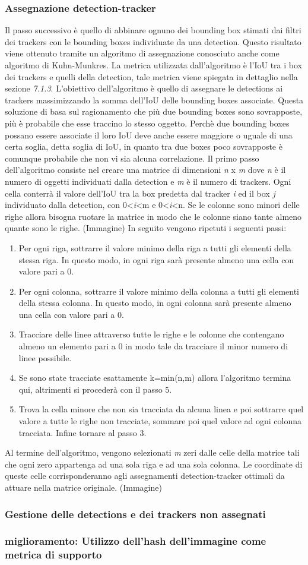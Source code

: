 \subsubsection{Assegnazione detection-tracker}
Il passo successivo è quello di abbinare ognuno dei bounding box stimati dai filtri dei trackers con le bounding boxes individuate da una detection.
Questo risultato viene ottenuto tramite un algoritmo di assegnazione conosciuto anche come algoritmo di Kuhn-Munkres. La metrica utilizzata dall'algoritmo è l'IoU tra i box dei trackers e quelli della detection, tale metrica viene spiegata in dettaglio nella sezione \textit{7.1.3}. L'obiettivo dell'algoritmo è quello di assegnare le detections ai trackers massimizzando la somma dell'IoU delle bounding boxes associate. Questa soluzione di basa sul ragionamento che più due bounding boxes sono sovrapposte, più è probabile che esse traccino lo stesso oggetto. Perchè due bounding boxes possano essere associate il loro IoU deve anche essere maggiore o uguale di una certa soglia, detta soglia di IoU, in quanto tra due boxes poco sovrapposte è comunque probabile che non vi sia alcuna correlazione.
Il primo passo dell'algoritmo consiste nel creare una matrice di dimensioni \textit{n} x \textit{m} dove \textit{n} è il numero di oggetti individuati dalla detection e \textit{m} è il numero di trackers. Ogni cella conterrà il valore dell'IoU tra la box predetta dal tracker \textit{i} ed il box \textit{j} individuato dalla detection, con 0<\textit{i}<m e 0<\textit{i}<n.
Se le colonne sono minori delle righe allora bisogna ruotare la matrice in modo che le colonne siano tante almeno quante sono le righe.
(Immagine)
In seguito vengono ripetuti i seguenti passi:
\begin{enumerate}
\item Per ogni riga, sottrarre il valore minimo della riga a tutti gli elementi della stessa riga. In questo modo, in ogni riga sarà presente almeno una cella con valore pari a 0.
\item Per ogni colonna, sottrarre il valore minimo della colonna a tutti gli elementi della stessa colonna. In questo modo, in ogni colonna sarà presente almeno una cella con valore pari a 0.
\item Tracciare delle linee attraverso tutte le righe e le colonne che contengano almeno un elemento pari a 0 in modo tale da tracciare il minor numero di linee possibile.
\item Se sono state tracciate esattamente k=min(n,m) allora l'algoritmo termina qui, altrimenti si procederà con il passo 5.
\item Trova la cella minore che non sia tracciata da alcuna linea e poi sottrarre quel valore a tutte le righe non tracciate, sommare poi quel valore ad ogni colonna tracciata. Infine tornare al passo 3.
\end{enumerate} 
Al termine dell'algoritmo, vengono selezionati \textit{m} zeri dalle celle della matrice tali che ogni zero appartenga ad una sola riga e ad una sola colonna. Le coordinate di queste celle corrisponderanno agli assegnamenti detection-tracker ottimali da attuare nella matrice originale.
(Immagine)
\subsubsection{Gestione delle detections e dei trackers non assegnati}
\subsubsection{miglioramento: Utilizzo dell'hash dell'immagine come metrica di supporto}